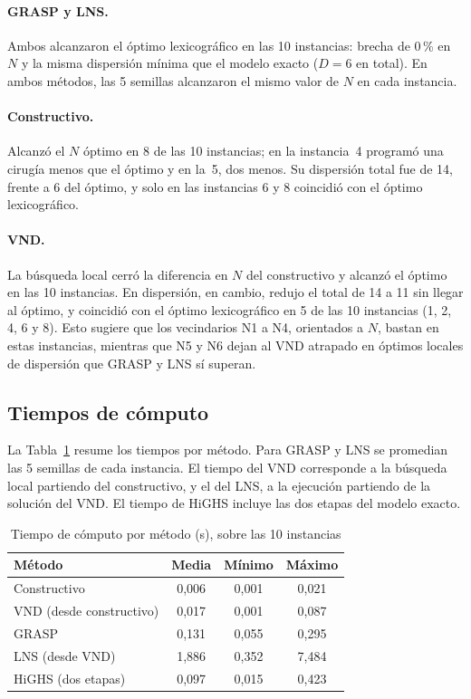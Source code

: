 \paragraph*{GRASP y LNS.} Ambos alcanzaron el óptimo lexicográfico en las 10 instancias: brecha de 0\,\% en $N$ y la misma dispersión mínima que el modelo exacto ($D=6$ en total). En ambos métodos, las 5 semillas alcanzaron el mismo valor de $N$ en cada instancia.

\paragraph*{Constructivo.} Alcanzó el $N$ óptimo en 8 de las 10 instancias; en la instancia~4 programó una cirugía menos que el óptimo y en la~5, dos menos. Su dispersión total fue de 14, frente a 6 del óptimo, y solo en las instancias 6 y 8 coincidió con el óptimo lexicográfico.

\paragraph*{VND.} La búsqueda local cerró la diferencia en $N$ del constructivo y alcanzó el óptimo en las 10 instancias. En dispersión, en cambio, redujo el total de 14 a 11 sin llegar al óptimo, y coincidió con el óptimo lexicográfico en 5 de las 10 instancias (1, 2, 4, 6 y 8). Esto sugiere que los vecindarios N1 a N4, orientados a $N$, bastan en estas instancias, mientras que N5 y N6 dejan al VND atrapado en óptimos locales de dispersión que GRASP y LNS sí superan.

\subsection{Tiempos de cómputo}

La Tabla~\ref{tab:tiempos} resume los tiempos por método. Para GRASP y LNS se promedian las 5 semillas de cada instancia. El tiempo del VND corresponde a la búsqueda local partiendo del constructivo, y el del LNS, a la ejecución partiendo de la solución del VND. El tiempo de HiGHS incluye las dos etapas del modelo exacto.

\begin{table}[t]
	\caption{Tiempo de cómputo por método (s), sobre las 10 instancias}
	\label{tab:tiempos}
	\centering
	\small
	\begin{tabular}{@{}lccc@{}}
		\hline
		Método & Media & Mínimo & Máximo \\
		\hline
		Constructivo            & 0,006 & 0,001 & 0,021 \\
		VND (desde constructivo)& 0,017 & 0,001 & 0,087 \\
		GRASP                   & 0,131 & 0,055 & 0,295 \\
		LNS (desde VND)         & 1,886 & 0,352 & 7,484 \\
		HiGHS (dos etapas)      & 0,097 & 0,015 & 0,423 \\
		\hline
	\end{tabular}
\end{table}

